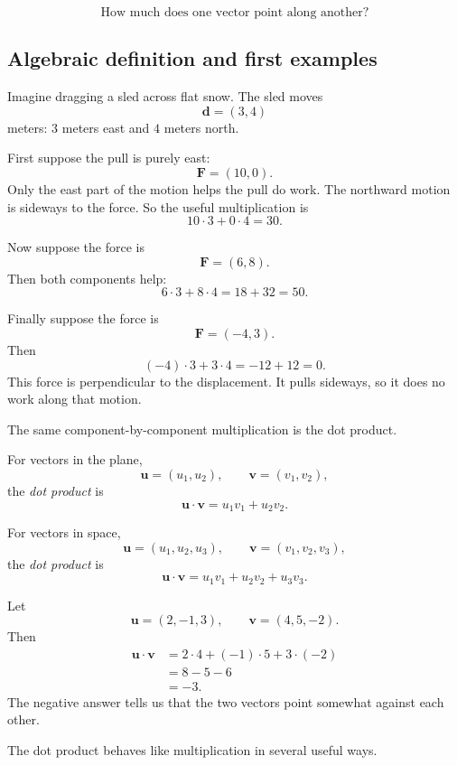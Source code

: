 \[
    \text{How much does one vector point along another?}
\]

\subsection{Algebraic definition and first examples}

Imagine dragging a sled across flat snow.  The sled moves
\[
    \mathbf d=(3,4)
\]
meters: \(3\) meters east and \(4\) meters north.

First suppose the pull is purely east:
\[
    \mathbf F=(10,0).
\]
Only the east part of the motion helps the pull do work.  The northward motion is
sideways to the force.  So the useful multiplication is
\[
    10\cdot3+0\cdot4=30.
\]

Now suppose the force is
\[
    \mathbf F=(6,8).
\]
Then both components help:
\[
    6\cdot3+8\cdot4=18+32=50.
\]

Finally suppose the force is
\[
    \mathbf F=(-4,3).
\]
Then
\[
    (-4)\cdot3+3\cdot4=-12+12=0.
\]
This force is perpendicular to the displacement.  It pulls sideways, so it does no work
along that motion.

The same component-by-component multiplication is the dot product.

\begin{definition}
For vectors in the plane,
\[
    \mathbf u=(u_1,u_2),
    \qquad
    \mathbf v=(v_1,v_2),
\]
the \emph{dot product} is
\[
    \mathbf u\cdot\mathbf v
    =
    u_1v_1+u_2v_2.
\]

For vectors in space,
\[
    \mathbf u=(u_1,u_2,u_3),
    \qquad
    \mathbf v=(v_1,v_2,v_3),
\]
the \emph{dot product} is
\[
    \mathbf u\cdot\mathbf v
    =
    u_1v_1+u_2v_2+u_3v_3.
\]
\end{definition}

\begin{example}
Let
\[
    \mathbf u=(2,-1,3),
    \qquad
    \mathbf v=(4,5,-2).
\]
Then
\[
\begin{aligned}
    \mathbf u\cdot\mathbf v
    &=
    2\cdot4+(-1)\cdot5+3\cdot(-2)\\
    &=
    8-5-6\\
    &=
    -3.
\end{aligned}
\]
The negative answer tells us that the two vectors point somewhat against each other.
\end{example}

The dot product behaves like multiplication in several useful ways.

